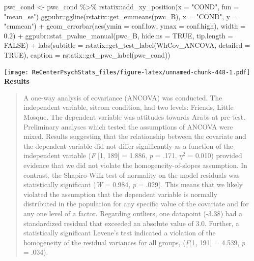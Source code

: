 \documentclass[
  11pt,
]{book}
\newenvironment{Shaded}{\begin{snugshade}}{\end{snugshade}}
\newcommand{\AttributeTok}[1]{\textcolor[rgb]{0.77,0.63,0.00}{#1}}
\newcommand{\ConstantTok}[1]{\textcolor[rgb]{0.00,0.00,0.00}{#1}}
\newcommand{\FloatTok}[1]{\textcolor[rgb]{0.00,0.00,0.81}{#1}}
\newcommand{\FunctionTok}[1]{\textcolor[rgb]{0.00,0.00,0.00}{#1}}
\newcommand{\NormalTok}[1]{#1}
\newcommand{\OtherTok}[1]{\textcolor[rgb]{0.56,0.35,0.01}{#1}}
\newcommand{\SpecialCharTok}[1]{\textcolor[rgb]{0.00,0.00,0.00}{#1}}
\newcommand{\StringTok}[1]{\textcolor[rgb]{0.31,0.60,0.02}{#1}}
\begin{document}
\begin{Shaded}
\begin{Highlighting}[]
\NormalTok{pwc\_cond }\OtherTok{\textless{}{-}}\NormalTok{ pwc\_cond }\SpecialCharTok{\%\textgreater{}\%}
\NormalTok{    rstatix}\SpecialCharTok{::}\FunctionTok{add\_xy\_position}\NormalTok{(}\AttributeTok{x =} \StringTok{"COND"}\NormalTok{, }\AttributeTok{fun =} \StringTok{"mean\_se"}\NormalTok{)}
\NormalTok{ggpubr}\SpecialCharTok{::}\FunctionTok{ggline}\NormalTok{(rstatix}\SpecialCharTok{::}\FunctionTok{get\_emmeans}\NormalTok{(pwc\_B), }\AttributeTok{x =} \StringTok{"COND"}\NormalTok{, }\AttributeTok{y =} \StringTok{"emmean"}\NormalTok{) }\SpecialCharTok{+}
    \FunctionTok{geom\_errorbar}\NormalTok{(}\FunctionTok{aes}\NormalTok{(}\AttributeTok{ymin =}\NormalTok{ conf.low, }\AttributeTok{ymax =}\NormalTok{ conf.high), }\AttributeTok{width =} \FloatTok{0.2}\NormalTok{) }\SpecialCharTok{+}
\NormalTok{    ggpubr}\SpecialCharTok{::}\FunctionTok{stat\_pvalue\_manual}\NormalTok{(pwc\_B, }\AttributeTok{hide.ns =} \ConstantTok{TRUE}\NormalTok{, }\AttributeTok{tip.length =} \ConstantTok{FALSE}\NormalTok{) }\SpecialCharTok{+}
    \FunctionTok{labs}\NormalTok{(}\AttributeTok{subtitle =}\NormalTok{ rstatix}\SpecialCharTok{::}\FunctionTok{get\_test\_label}\NormalTok{(WhCov\_ANCOVA, }\AttributeTok{detailed =} \ConstantTok{TRUE}\NormalTok{),}
        \AttributeTok{caption =}\NormalTok{ rstatix}\SpecialCharTok{::}\FunctionTok{get\_pwc\_label}\NormalTok{(pwc\_cond))}
\end{Highlighting}
\end{Shaded}

\texttt{[image: ReCenterPsychStats\_files/figure-latex/unnamed-chunk-448-1.pdf]}
\textbf{Results}

\begin{quote}
A one-way analysis of covariance (ANCOVA) was conducted. The independent variable, sitcom condition, had two levels: Friends, Little Mosque. The dependent variable was attitudes towards Arabs at pre-test. Preliminary analyses which tested the assumptions of ANCOVA were mixed. Results suggesting that the relationship between the covariate and the dependent variable did not differ significantly as a function of the independent variable (\emph{F} {[}1, 189{]} = 1.886, \emph{p} = .171, \(\eta^2\) = 0.010) provided evidence that we did not violate the homogeneity-of-slopes assumption. In contrast, the Shapiro-Wilk test of normality on the model residuals was statistically significant (\emph{W} = 0.984, \emph{p} = .029). This means that we likely violated the assumption that the dependent variable is normally distributed in the population for any specific value of the covariate and for any one level of a factor. Regarding outliers, one datapoint (-3.38) had a standardized residual that exceeded an absolute value of 3.0. Further, a statistically significant Levene's test indicated a violation of the homogeneity of the residual variances for all groups, (\emph{F}{[}1, 191{]} = 4.539, \emph{p} = .034).
\end{quote}
\end{document}
